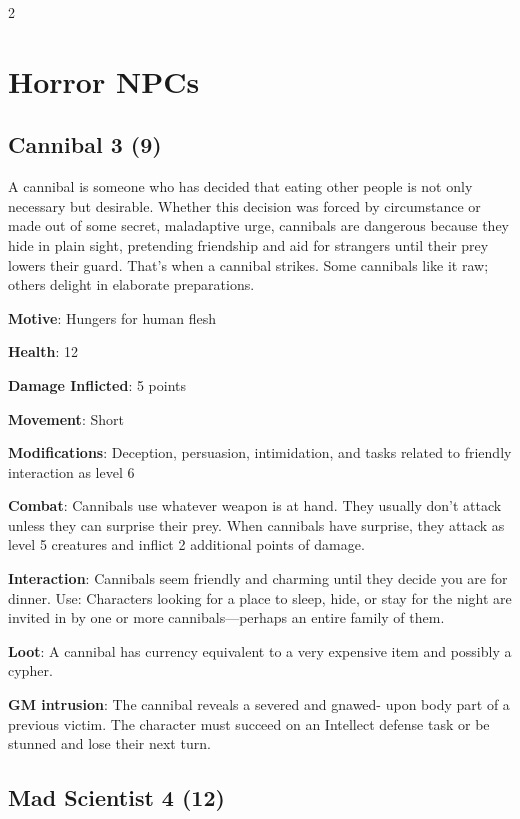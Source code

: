 \begin{multicols}{2}

\chapter{Horror NPCs}

\section{Cannibal 3 (9)}

A cannibal is someone who has decided that eating other people is not only necessary but desirable. Whether this decision was forced by circumstance or made out of some secret, maladaptive urge, cannibals are dangerous because they hide in plain sight, pretending friendship and aid for strangers until their prey lowers their guard. That’s when a cannibal strikes. Some cannibals like it raw; others delight in elaborate preparations.

\textbf{Motive}: Hungers for human flesh 

\textbf{Health}: 12

\textbf{Damage Inflicted}: 5 points 

\textbf{Movement}: Short

\textbf{Modifications}: Deception, persuasion, intimidation, and tasks related to friendly interaction as level 6

\textbf{Combat}: Cannibals use whatever weapon is at hand. They usually don’t attack unless they can surprise their prey. When cannibals have surprise, they attack as level 5 creatures and inflict 2 additional points of damage.

\textbf{Interaction}: Cannibals seem friendly and charming until they decide you are for dinner. Use: Characters looking for a place to sleep, hide, or stay for the night are invited in by one or more cannibals—perhaps an entire family of them.

\textbf{Loot}: A cannibal has currency equivalent to a very expensive item and possibly a cypher.

\textbf{GM intrusion}: The cannibal reveals a severed and gnawed- upon body part of a previous victim. The character must succeed on an Intellect defense task or be stunned and lose their next turn.

\section{Mad Scientist 4 (12)}


\end{multicols}
